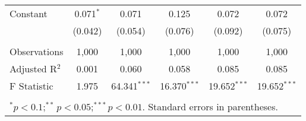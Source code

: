 \documentclass[11pt, a4paper]{article}\usepackage[]{graphicx}\usepackage[]{color}
\begin{document}
\begin{table}[!htbp]
\begin{tabular}{@{\extracolsep{5pt}}lccccc}
  Constant & 0.071$^{*}$ & 0.071 & 0.125 & 0.072 & 0.072 \\ 
  & (0.042) & (0.054) & (0.076) & (0.092) & (0.075) \\ 
 \hline \\[-1.8ex] 
Observations & 1,000 & 1,000 & 1,000 & 1,000 & 1,000 \\ 
Adjusted R$^{2}$ & 0.001 & 0.060 & 0.058 & 0.085 & 0.085 \\ 
F Statistic & 1.975 & 64.341$^{***}$ & 16.370$^{***}$ & 19.652$^{***}$ & 19.652$^{***}$ \\ 
\hline 
\hline \\[-1.8ex] 
\multicolumn{6}{l}{\parbox[t]{10cm}{$^{*}p<0.1;^{**}p<0.05;^{***}p<0.01$. Standard errors in parentheses.}} \\ 
\end{tabular} 
\end{table} 
\end{document}

